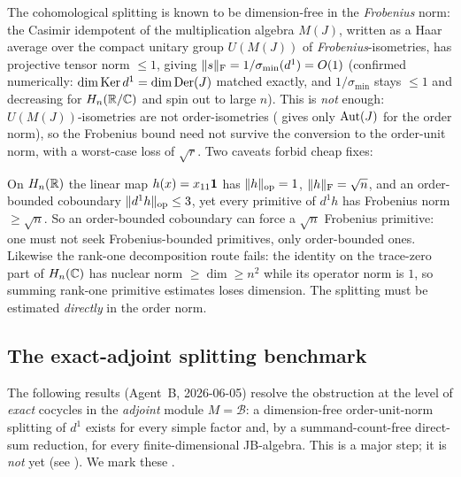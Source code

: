 The cohomological splitting is known to be dimension-free in the \emph{Frobenius}
norm: the Casimir idempotent of the multiplication algebra $M(J)$, written as a
Haar average over the compact unitary group $U(M(J))$ of
\emph{Frobenius}-isometries, has projective tensor norm $\le1$, giving
$\lVert s \rVert_{\mathrm{F}}=1/\sigma_{\min}(d^1)=O(1)$ (confirmed numerically:
$\dim\operatorname{Ker} d^1=\dim\mathrm{Der}(J)$ matched exactly, and $1/\sigma_{\min}$ stays
$\le1$ and decreasing for $H_n(\mathbb{R}/\mathbb{C})$ and spin out to large $n$). This is
\emph{not} enough: $U(M(J))$-isometries are not order-isometries
( gives only $\operatorname{Aut}(J)$ for the order norm), so the
Frobenius bound need not survive the conversion to the order-unit norm, with a
worst-case loss of $\sqrt r$. Two caveats forbid cheap fixes:

\begin{remark}\label{rem:cochain-caveats}
On $H_n(\mathbb{R})$ the linear map $h(x)=x_{11}\mathbf{1}$ has $\lVert h \rVert_{\mathrm{op}}=1$,
$\lVert h \rVert_{\mathrm F}=\sqrt n$, and an order-bounded coboundary
$\lVert d^1h \rVert_{\mathrm{op}}\le3$, yet every primitive of $d^1h$ has Frobenius norm
$\ge\sqrt n$. So an order-bounded coboundary can force a $\sqrt n$ Frobenius
primitive: one must not seek Frobenius-bounded primitives, only order-bounded
ones. Likewise the rank-one decomposition route fails: the identity on the
trace-zero part of $H_n(\mathbb{C})$ has nuclear norm $\ge\dim\ge n^2$ while its operator
norm is $1$, so summing rank-one primitive estimates loses dimension. The
splitting must be estimated \emph{directly} in the order norm.
\end{remark}

\subsection{The exact-adjoint splitting benchmark}

The following results (Agent~B, 2026-06-05) resolve the obstruction at the level
of \emph{exact} cocycles in the \emph{adjoint} module $M=\mathcal B$: a
dimension-free order-unit-norm splitting of $d^1$ exists for every simple factor
and, by a summand-count-free direct-sum reduction, for every finite-dimensional
JB-algebra. This is a major step; it is \emph{not} yet 
(see ). We mark these
.

